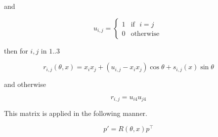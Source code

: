 \documentclass[12pt]{article}
\begin{document}
and

\[ u_{i,j} = \left \{ \begin{array}{ll}
     1 & \mbox{if}\:\:\: i = j \\
     0 & \mbox{otherwise}\: 
   \end{array} \right .
\]

then for $i, j$ in $1 .. 3$

\[
  r_{i,j}(\theta, x) =
    x_i x_j + (u_{i,j} - x_ix_j)\cos \theta + s_{i,j}(x) \sin \theta
\]

and otherwise

\[
  r_{i,j} = u_{i4} u_{j4}
\]

This matrix is applied in the following manner.

\[
  p' = R(\theta, x) p^\top
\]
\end{document}
